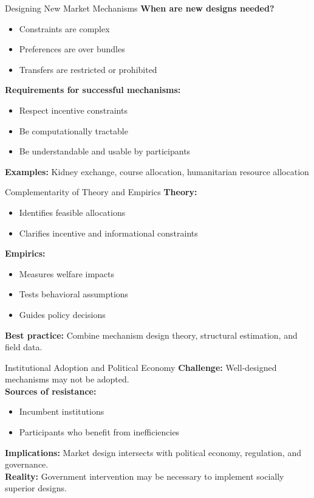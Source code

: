 \documentclass{beamer}
\begin{document}
\begin{frame}{Designing New Market Mechanisms}
\textbf{When are new designs needed?}
\begin{itemize}
  \item Constraints are complex
  \item Preferences are over bundles
  \item Transfers are restricted or prohibited
\end{itemize}
\vspace{0.5cm}
\textbf{Requirements for successful mechanisms:}
\begin{itemize}
  \item Respect incentive constraints
  \item Be computationally tractable
  \item Be understandable and usable by participants
\end{itemize}
\vspace{0.5cm}
\textbf{Examples:} Kidney exchange, course allocation, humanitarian resource allocation
\end{frame}

\begin{frame}{Complementarity of Theory and Empirics}
\textbf{Theory:}
\begin{itemize}
  \item Identifies feasible allocations
  \item Clarifies incentive and informational constraints
\end{itemize}
\vspace{0.5cm}
\textbf{Empirics:}
\begin{itemize}
  \item Measures welfare impacts
  \item Tests behavioral assumptions
  \item Guides policy decisions
\end{itemize}
\vspace{0.5cm}
\textbf{Best practice:} Combine mechanism design theory, structural estimation, and field data.
\end{frame}

\begin{frame}{Institutional Adoption and Political Economy}
\textbf{Challenge:} Well-designed mechanisms may not be adopted.
\vspace{0.5cm}
\\
\textbf{Sources of resistance:}
\begin{itemize}
  \item Incumbent institutions
  \item Participants who benefit from inefficiencies
\end{itemize}
\vspace{0.5cm}
\textbf{Implications:} Market design intersects with political economy, regulation, and governance.
\vspace{0.5cm}
\\
\textbf{Reality:} Government intervention may be necessary to implement socially superior designs.
\end{frame}
\end{document}
